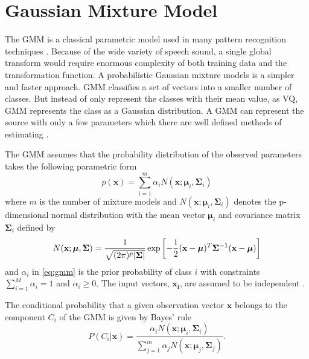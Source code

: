 \section{Gaussian Mixture Model} %
\label{sec:gaussian_mixture_model}
The GMM is a classical parametric model used in many pattern recognition techniques \cite{stylianou98}. Because of the wide variety of speech sound, a single global transform would require enormous complexity of both training data and the transformation function. A probabilistic Gaussian mixture models is a simpler and faster approach. GMM classifies a set of vectors into a smaller number of classes. But instead of only represent the classes with their mean value, as VQ, GMM represents the class as a Gaussian distribution. A GMM can represent the source with only a few parameters which there are well defined methods of estimating \cite{taletek}.

The GMM assumes that the probability distribution of the observed parameters takes the following parametric form
\begin{equation}
	\label{eq:gmm}
	p(\mathbf{x}) = \sum_{i=1}^{m} \alpha_i N(\mathbf{x}; \boldsymbol{\mu}_i, \mathbf{\Sigma}_i)
\end{equation}
where $m$ is the number of mixture models and $N(\mathbf{x}; \boldsymbol{\mu}_i, \mathbf{\Sigma}_i)$ denotes the p-dimensional normal distribution with the mean vector $\boldsymbol{\mu}_i$ and covariance matrix $\mathbf{\Sigma}_i$ defined by
\begin{equation}
	N(\mathbf{x}; \boldsymbol{\mu}, \mathbf{\Sigma}) = \frac{1}{\sqrt{(2\pi)^p\lvert\mathbf{\Sigma}\rvert}} \exp\left[ -\frac{1}{2} (\mathbf{x} -\boldsymbol{\mu})^T \mathbf{\Sigma}^{-1} (\mathbf{x} -\boldsymbol{\mu})\right]
\end{equation}
and $\alpha_i$ in \eqref{eq:gmm} is the prior probability of class $i$ with constraints $\sum_{i=1}^{M}\alpha_i = 1$ and $\alpha_i \geq 0$. The input vectors, $\mathbf{x_i}$, are assumed to be independent \cite{stylianou98}.

The conditional probability that a given observation vector $\mathbf{x}$ belongs to the component $C_i$ of the GMM is given by Bayes' rule \cite{statistikk}
\begin{equation}
	\label{eq:bayes}
	P(C_i\vert \mathbf{x}) = \frac{\alpha_i N(\mathbf{x}; \boldsymbol{\mu}_i, \mathbf{\Sigma}_i)}{\sum_{j=1}^{m}\alpha_j N(\mathbf{x}; \boldsymbol{\mu}_j, \mathbf{\Sigma}_j)}.
\end{equation}

